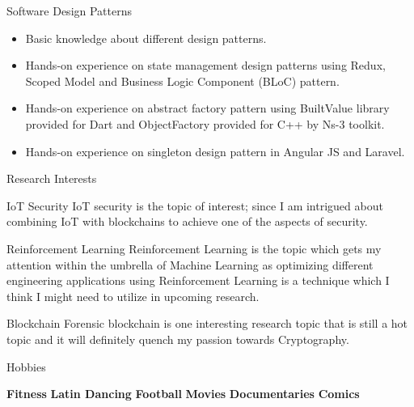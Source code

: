 \documentclass[]{mcdowellcv}
\begin{document}
	
	
	\begin{cvsection}{Software Design Patterns}
		\begin{cvsubsection}{}{}{}	
			\begin{itemize}
				\item Basic knowledge about different design patterns.
				\item Hands-on experience on state management design patterns using Redux, Scoped Model and Business Logic Component (BLoC) pattern.
				\item Hands-on experience on abstract factory pattern using BuiltValue library provided for Dart and ObjectFactory provided for C++ by Ns-3 toolkit.
				\item Hands-on experience on singleton design pattern in Angular JS and Laravel. 
			\end{itemize}
		\end{cvsubsection}
	\end{cvsection}	
	
	
	\begin{cvsection}{Research Interests}
		\begin{cvsubsection}{IoT Security}{}{}
			IoT security is the topic of interest; since I am intrigued about combining IoT with blockchains to achieve one of the aspects of security.
		\end{cvsubsection}
		
		\begin{cvsubsection}{Reinforcement Learning}{}{}
			Reinforcement Learning is the topic which gets my attention within the umbrella of Machine Learning as optimizing different engineering applications using Reinforcement Learning is a technique which I think I might need to utilize in upcoming research.
		\end{cvsubsection}
		
		\begin{cvsubsection}{Blockchain}{}{}
			Forensic blockchain is one interesting research topic that is still a hot topic and it will definitely quench my passion towards Cryptography.
		\end{cvsubsection}
		
	\end{cvsection}
	
	\begin{cvsection}{Hobbies}
		\begin{cvsubsection}{}{}{}
			\textbf{Fitness} \hspace{1.5cm}
			\textbf{Latin Dancing} \hspace{1.5cm}
			\textbf{Football} \hspace{1.5cm}
			\textbf{Movies} \hspace{1.5cm}
			\textbf{Documentaries} \hspace{1.5cm}
			\textbf{Comics}
		\end{cvsubsection}
	\end{cvsection}
	
\end{document}
